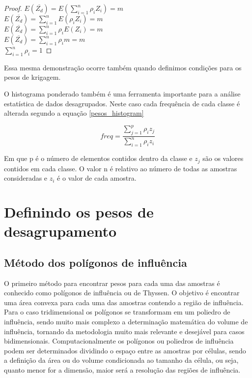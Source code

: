  \begin{proof}
 	$E(\overline{Z_{d}}) = E\left(  \sum_{i=1}^{n} \rho _{i} Z_{i} \right)= m$\\
 	$E(\overline{Z_{d}}) =  \sum_{i=1}^{n} E(\rho _{i} Z_{i}) = m $\\
 	$E(\overline{Z_{d}}) =  \sum_{i=1}^{n} \rho _{i}E( Z_{i}) = m $\\
 	$E(\overline{Z_{d}}) =  \sum_{i=1}^{n} \rho _{i}m = m $\\
 	$ \sum_{i=1}^{n} \rho _{i} = 1 $
 	
 \end{proof}
 
 Essa mesma demonstração ocorre também quando definimos condições para os pesos de krigagem. 
 
 O histograma ponderado também é uma ferramenta importante para a análise estatística de dados desagrupados. Neste caso cada frequência de cada classe é alterada segundo a equação \eqref{pesos_histogram}
 
  \begin{equation}\label{pesos_histogram}
  freq = \frac{\sum_{j=1}^{p} \rho _{i}  z_{j}}{\sum_{i=1}^{n} \rho _{i}  z_{i}} 
  \end{equation}
  
  Em que p é o número de elementos contidos dentro da classe e $z_{j}$ são os valores contidos em cada classe. O valor n é relativo ao número de todas as amostras consideradas e $z_{i}$ é o valor de cada amostra.
 
 \section{Definindo os pesos de desagrupamento}
 
 \subsection{Método dos polígonos de influência}
 
 O primeiro método para encontrar pesos para cada uma das amostras é conhecido como polígonos de influência ou de Thyssen. O objetivo é encontrar uma área convexa para cada uma das amostras contendo a região de influência. Para o caso tridimensional os polígonos se transformam em um poliedro de influência, sendo muito mais complexo a determinação matemática do volume de influência, tornando da metodologia muito mais relevante e desejável para casos bidimensionais. Computacionalmente os polígonos ou poliedros de influência podem ser determinados dividindo o espaço entre as amostras por células, sendo a definição da área ou do volume condicionada ao tamanho da célula, ou seja, quanto menor for a dimensão, maior será a resolução das regiões de influência.
 
